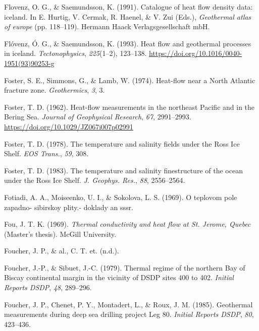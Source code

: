 \documentclass[draft,linenumbers]{agujournal2018}
\begin{document}
\leavevmode{}%
Flovenz, O. G., \& Saemundsson, K. (1991). Catalogue of heat flow
density data: iceland. In E. Hurtig, V. Cermak, R. Haenel, \& V. Zui
(Eds.), \emph{Geothermal atlas of europe} (pp. 118--119). Hermann Haack
Verlagsgesellschaft mbH.

\leavevmode{}%
Flóvenz, Ó. G., \& Saemundsson, K. (1993). Heat flow and geothermal
processes in iceland. \emph{Tectonophysics}, \emph{225}(1--2), 123--138.
\url{https://doi.org/10.1016/0040-1951(93)90253-g}

\leavevmode{}%
Foster, S. E., Simmons, G., \& Lamb, W. (1974). Heat-flow near a {North
Atlantic} fracture zone. \emph{Geothermics}, \emph{3}, 3.

\leavevmode{}%
Foster, T. D. (1962). Heat-flow measurements in the northeast {Pacific}
and in the {Bering Sea}. \emph{Journal of Geophysical Research},
\emph{67}, 2991--2993. \url{https://doi.org/10.1029/JZ067i007p02991}

\leavevmode{}%
Foster, T. D. (1978). The temperature and salinity fields under the
{Ross Ice Shelf}. \emph{EOS Trans.}, \emph{59}, 308.

\leavevmode{}%
Foster, T. D. (1983). The temperature and salinity finestructure of the
ocean under the {Ross Ice Shelf}. \emph{J. Geophys. Res.}, \emph{88},
2556--2564.

\leavevmode{}%
Fotiadi, A. A., Moiseenko, U. I., \& Sokolova, L. S. (1969). O teplovom
pole zapadno- sibirskoy plity.- doklady an sssr.

\leavevmode{}%
Fou, J. T. K. (1969). \emph{Thermal conductivity and heat flow at {St.
Jerome, Quebec}} (Master's thesis). McGill University.

\leavevmode{}%
Foucher, J. P., \& al., C. T. et. (n.d.).

\leavevmode{}%
Foucher, J.-P., \& Sibuet, J.-C. (1979). Thermal regime of the northern
{Bay of Biscay} continental margin in the vicinity of DSDP sites 400 to
402. \emph{Initial Reports DSDP}, \emph{48}, 289--296.

\leavevmode{}%
Foucher, J. P., Chenet, P. Y., Montadert, L., \& Roux, J. M. (1985).
Geothermal measurements during deep sea drilling project {Leg 80}.
\emph{Initial Reports DSDP}, \emph{80}, 423--436.
\end{document}
